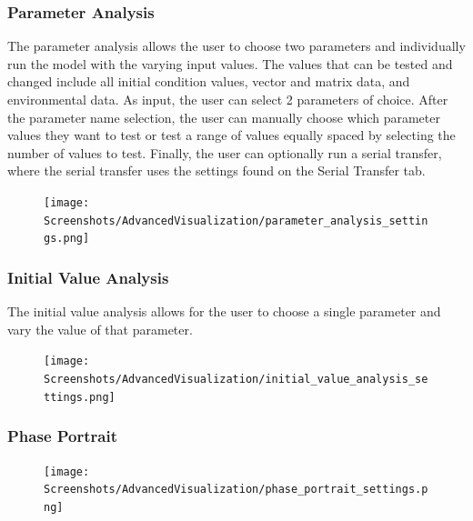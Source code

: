 \subsubsection{Parameter Analysis}
The parameter analysis allows the user to choose two parameters and individually run the model with the varying input values. 
The values that can be tested and changed include all initial condition values, vector and matrix data, and environmental data. 
As input, the user can select 2 parameters of choice. 
After the parameter name selection, the user can manually choose which parameter values they want to test or test a range of values equally spaced by selecting the number of values to test. 
Finally, the user can optionally run a serial transfer, where the serial transfer uses the settings found on the Serial Transfer tab. 
\begin{figure}
    \centering
    \texttt{[image: Screenshots/AdvancedVisualization/parameter\_analysis\_settings.png]}
    \caption{
    }
    \label{fig:ss:av:parameter_analysis_settings}
\end{figure}

\subsubsection{Initial Value Analysis}
The initial value analysis allows for the user to choose a single parameter and vary the value of that parameter. 

\begin{figure}
    \centering
    \texttt{[image: Screenshots/AdvancedVisualization/initial\_value\_analysis\_settings.png]}
    \caption{
    }
    \label{fig:ss:av:initial_value_analysis_settings}
\end{figure}

\subsubsection{Phase Portrait}
\begin{figure}
    \centering 
    \texttt{[image: Screenshots/AdvancedVisualization/phase\_portrait\_settings.png]}
    \caption{
    }
    \label{fig:ss:av:phase_portrait_settings}
\end{figure}

